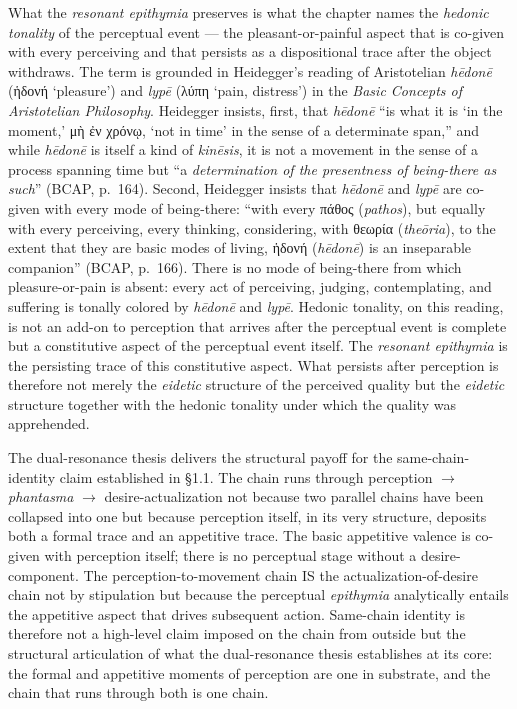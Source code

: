\documentclass{article}
\newcommand{\gk}[1]{{\greekfont #1}}
\begin{document}
What the \textit{resonant epithymia} preserves is what the chapter names the \textit{hedonic tonality} of the perceptual event --- the pleasant-or-painful aspect that is co-given with every perceiving and that persists as a dispositional trace after the object withdraws. The term is grounded in Heidegger's reading of Aristotelian \textit{hēdonē} (\gk{ἡδονή} `pleasure') and \textit{lypē} (\gk{λύπη} `pain, distress') in the \textit{Basic Concepts of Aristotelian Philosophy}. Heidegger insists, first, that \textit{hēdonē} ``is what it is `in the moment,' \gk{μὴ ἐν χρόνῳ}, `not in time' in the sense of a determinate span,'' and while \textit{hēdonē} is itself a kind of \textit{kinēsis}, it is not a movement in the sense of a process spanning time but ``a \textit{determination of the presentness of being-there as such}'' (BCAP, p.~164). Second, Heidegger insists that \textit{hēdonē} and \textit{lypē} are co-given with every mode of being-there: ``with every \gk{πάθος} (\textit{pathos}), but equally with every perceiving, every thinking, considering, with \gk{θεωρία} (\textit{theōria}), to the extent that they are basic modes of living, \gk{ἡδονή} (\textit{hēdonē}) is an inseparable companion'' (BCAP, p.~166). There is no mode of being-there from which pleasure-or-pain is absent: every act of perceiving, judging, contemplating, and suffering is tonally colored by \textit{hēdonē} and \textit{lypē}. Hedonic tonality, on this reading, is not an add-on to perception that arrives after the perceptual event is complete but a constitutive aspect of the perceptual event itself. The \textit{resonant epithymia} is the persisting trace of this constitutive aspect. What persists after perception is therefore not merely the \textit{eidetic} structure of the perceived quality but the \textit{eidetic} structure together with the hedonic tonality under which the quality was apprehended.

The dual-resonance thesis delivers the structural payoff for the same-chain-identity claim established in §1.1. The chain runs through perception $\rightarrow$ \textit{phantasma} $\rightarrow$ desire-actualization not because two parallel chains have been collapsed into one but because perception itself, in its very structure, deposits both a formal trace and an appetitive trace. The basic appetitive valence is co-given with perception itself; there is no perceptual stage without a desire-component. The perception-to-movement chain IS the actualization-of-desire chain not by stipulation but because the perceptual \textit{epithymia} analytically entails the appetitive aspect that drives subsequent action. Same-chain identity is therefore not a high-level claim imposed on the chain from outside but the structural articulation of what the dual-resonance thesis establishes at its core: the formal and appetitive moments of perception are one in substrate, and the chain that runs through both is one chain.
\end{document}
